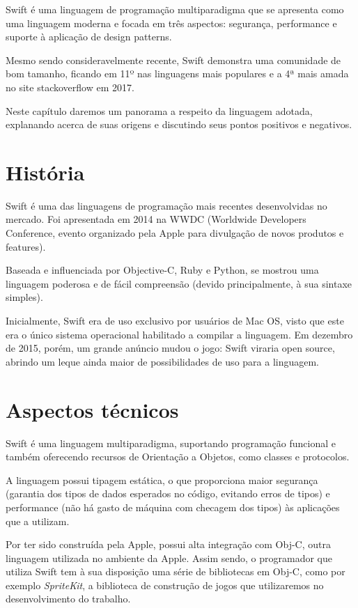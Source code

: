\documentclass[rel_mlp]{iiufrgs}
\begin{document}
Swift é uma linguagem de programação multiparadigma que se apresenta como uma linguagem moderna e focada em três aspectos: segurança, performance e suporte à aplicação de design patterns.

Mesmo sendo consideravelmente recente, Swift demonstra uma comunidade de bom tamanho, ficando em 11º nas linguagens mais populares e a 4ª mais amada no site stackoverflow em 2017.

Neste capítulo daremos um panorama a respeito da linguagem adotada, explanando acerca de suas origens e discutindo seus pontos positivos e negativos.


\section{História}

Swift é uma das linguagens de programação mais recentes desenvolvidas no mercado. Foi apresentada em 2014 na WWDC (Worldwide Developers Conference, evento organizado pela Apple para divulgação de novos produtos e features).

Baseada e influenciada por Objective-C, Ruby e Python, se mostrou uma linguagem poderosa e de fácil compreensão (devido principalmente, à sua sintaxe simples).

Inicialmente, Swift era de uso exclusivo por usuários de Mac OS, visto que este era o único sistema operacional habilitado a compilar a linguagem. Em dezembro de 2015, porém, um grande anúncio mudou o jogo: Swift viraria open source, abrindo um leque ainda maior de possibilidades de uso para a linguagem.


\section{Aspectos técnicos}

Swift é uma linguagem multiparadigma, suportando programação funcional e também oferecendo recursos de Orientação a Objetos, como classes e protocolos.

A linguagem possui tipagem estática, o que proporciona maior segurança (garantia dos tipos de dados esperados no código, evitando erros de tipos) e performance (não há gasto de máquina com checagem dos tipos) às aplicações que a utilizam.

Por ter sido construída pela Apple, possui alta integração com Obj-C, outra linguagem utilizada no ambiente da Apple. Assim sendo, o programador que utiliza Swift tem à sua disposição uma série de bibliotecas em Obj-C, como por exemplo \textit{SpriteKit}, a biblioteca de construção de jogos que utilizaremos no desenvolvimento do trabalho.
\end{document}
